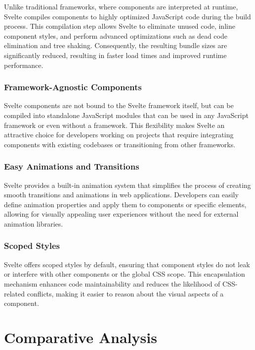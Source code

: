 Unlike traditional frameworks, where components are interpreted at runtime, Svelte compiles components to highly optimized JavaScript code during the build process. This compilation step allows Svelte to eliminate unused code, inline component styles, and perform advanced optimizations such as dead code elimination and tree shaking. Consequently, the resulting bundle sizes are significantly reduced, resulting in faster load times and improved runtime performance.

\subsubsection{Framework-Agnostic Components}

Svelte components are not bound to the Svelte framework itself, but can be compiled into standalone JavaScript modules that can be used in any JavaScript framework or even without a framework. This flexibility makes Svelte an attractive choice for developers working on projects that require integrating components with existing codebases or transitioning from other frameworks.

\subsubsection{Easy Animations and Transitions}

Svelte provides a built-in animation system that simplifies the process of creating smooth transitions and animations in web applications. Developers can easily define animation properties and apply them to components or specific elements, allowing for visually appealing user experiences without the need for external animation libraries.

\subsubsection{Scoped Styles}

Svelte offers scoped styles by default, ensuring that component styles do not leak or interfere with other components or the global CSS scope. This encapsulation mechanism enhances code maintainability and reduces the likelihood of CSS-related conflicts, making it easier to reason about the visual aspects of a component.

\section{Comparative Analysis}

